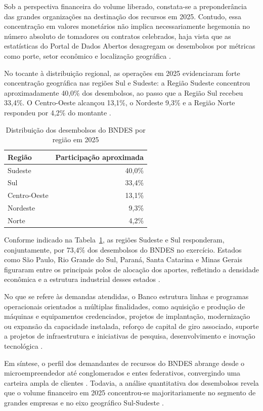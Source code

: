 Sob a perspectiva financeira do volume liberado, constata-se a preponderância das grandes organizações na destinação dos recursos em 2025. Contudo, essa concentração em valores monetários não implica necessariamente hegemonia no número absoluto de tomadores ou contratos celebrados, haja vista que as estatísticas do Portal de Dados Abertos desagregam os desembolsos por métricas como porte, setor econômico e localização geográfica \cite{bndes_estatisticas_desembolsos_2026}.

No tocante à distribuição regional, as operações em 2025 evidenciaram forte concentração geográfica nas regiões Sul e Sudeste: a Região Sudeste concentrou aproximadamente 40,0\% dos desembolsos, ao passo que a Região Sul recebeu 33,4\%. O Centro-Oeste alcançou 13,1\%, o Nordeste 9,3\% e a Região Norte respondeu por 4,2\% do montante \cite{bndes_estatisticas_desembolsos_2026}.

\begin{table}[htbp]
  \centering
  \caption{Distribuição dos desembolsos do BNDES por região em 2025}
  \label{tab:desembolsos_regiao_2025}
  \begin{tabular}{lr}
    \hline
    \textbf{Região} & \textbf{Participação aproximada} \\
    \hline
    Sudeste      & 40,0\% \\
    Sul          & 33,4\% \\
    Centro-Oeste & 13,1\% \\
    Nordeste     & 9,3\%  \\
    Norte        & 4,2\%  \\
    \hline
  \end{tabular}
\end{table}

Conforme indicado na Tabela~\ref{tab:desembolsos_regiao_2025}, as regiões Sudeste e Sul responderam, conjuntamente, por 73,4\% dos desembolsos do BNDES no exercício. Estados como São Paulo, Rio Grande do Sul, Paraná, Santa Catarina e Minas Gerais figuraram entre os principais polos de alocação dos aportes, refletindo a densidade econômica e a estrutura industrial desses estados \cite{bndes_estatisticas_desembolsos_2026}.

No que se refere às demandas atendidas, o Banco estrutura linhas e programas operacionais orientados a múltiplas finalidades, como aquisição e produção de máquinas e equipamentos credenciados, projetos de implantação, modernização ou expansão da capacidade instalada, reforço de capital de giro associado, suporte a projetos de infraestrutura e iniciativas de pesquisa, desenvolvimento e inovação tecnológica \cite{bndes2026faq}. 

Em síntese, o perfil dos demandantes de recursos do BNDES abrange desde o microempreendedor até conglomerados e entes federativos, convergindo uma carteira ampla de clientes \cite{bndes2026cliente}. Todavia, a análise quantitativa dos desembolsos revela que o volume financeiro em 2025 concentrou-se majoritariamente no segmento de grandes empresas e no eixo geográfico Sul-Sudeste \cite{bndes_estatisticas_desembolsos_2026}.